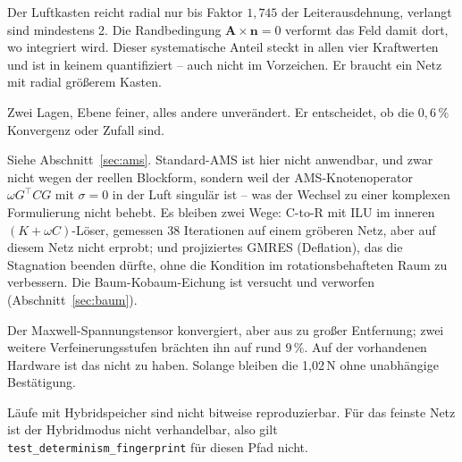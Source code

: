 \documentclass[11pt,a4paper]{article}
\begin{document}
\begin{description}[style=nextline,leftmargin=1em]
\item[Abschneidefaktor.] Der Luftkasten reicht radial nur bis Faktor $1{,}745$
  der Leiterausdehnung, verlangt sind mindestens 2. Die Randbedingung
  $\mathbf{A}\times\mathbf{n} = 0$ verformt das Feld damit dort, wo integriert
  wird. Dieser systematische Anteil steckt in allen vier Kraftwerten und ist
  in keinem quantifiziert -- auch nicht im Vorzeichen. Er braucht ein Netz mit
  radial größerem Kasten.
\item[Fünfter Netzpunkt.] Zwei Lagen, Ebene feiner, alles andere unverändert.
  Er entscheidet, ob die $0{,}6\,\%$ Konvergenz oder Zufall sind.
\item[Vorkonditionierung.] Siehe Abschnitt~\ref{sec:ams}. Standard-AMS ist
  hier nicht anwendbar, und zwar nicht wegen der reellen Blockform, sondern
  weil der AMS-Knotenoperator $\omega G^{\!\top}CG$ mit $\sigma = 0$ in der
  Luft singulär ist -- was der Wechsel zu einer komplexen Formulierung nicht
  behebt. Es bleiben zwei Wege: C-to-R mit ILU im inneren
  $(K+\omega C)$-Löser, gemessen 38 Iterationen auf einem gröberen Netz, aber
  auf diesem Netz nicht erprobt; und projiziertes GMRES (Deflation), das die
  Stagnation beenden dürfte, ohne die Kondition im rotationsbehafteten Raum zu
  verbessern. Die Baum-Kobaum-Eichung ist versucht und verworfen
  (Abschnitt~\ref{sec:baum}).
\item[Zweiter Kraftpfad.] Der Maxwell-Spannungstensor konvergiert, aber aus zu
  großer Entfernung; zwei weitere Verfeinerungsstufen brächten ihn auf rund
  $9\,\%$. Auf der vorhandenen Hardware ist das nicht zu haben. Solange
  bleiben die 1,02\,N ohne unabhängige Bestätigung.
\item[Determinismus.] Läufe mit Hybridspeicher sind nicht bitweise
  reproduzierbar. Für das feinste Netz ist der Hybridmodus nicht verhandelbar,
  also gilt \texttt{test\_determinism\_fingerprint} für diesen Pfad nicht.
\end{description}
\end{document}
